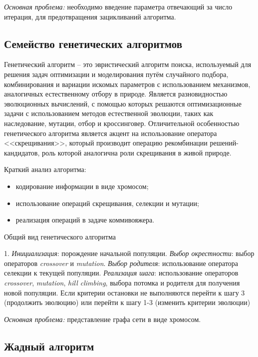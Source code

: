 \emph{Основная проблема:} необходимо введение параметра отвечающий за число итерация, для предотвращения 
зацикливаний алгоритма.

\subsection{Семейство генетических алгоритмов}
Генетический алгоритм -- это эвристический алгоритм поиска, используемый для решения задач оптимизации и 
моделирования путём случайного подбора, комбинирования и вариации искомых параметров с использованием 
механизмов, аналогичных естественному отбору в природе. Является разновидностью эволюционных вычислений, 
с помощью которых решаются оптимизационные задачи с использованием методов естественной эволюции, таких 
как наследование, мутации, отбор и кроссинговер. Отличительной особенностью генетического алгоритма 
является акцент на использование оператора <<скрещивания>>, который производит операцию рекомбинации 
решений-кандидатов, роль которой аналогична роли скрещивания в живой природе.

Краткий анализ алгоритма:
\begin{itemize}
    \item кодирование информации в виде хромосом;
    \item использование операций скрещивания, селекции и мутации;
    \item реализация операций в задаче коммивояжера.
\end{itemize}

\begin{algorithm}[ht!]
    \caption{Общий вид генетического алгоритма}
    1. \emph{Инициализация}: порождение начальной популяции. \emph{Выбор окрестности}: выбор операторов \emph{crossover} и \emph{mutation}. \emph{Выбор родителя}: использование оператора селекции к текущей популяции. \emph{Реализация шага}: использование операторов \emph{crossover}, 
        \emph{mutation}, \emph{hill climbing}, выбора потомка и родителя для получения 
        новой популяции. Если критерии остановки не выполняются перейти к шагу 3 (продолжить эволюцию) 
        или перейти к шагу 1-3 (изменить критерии эволюции)\;
    \label{alg:genetic}
\end{algorithm}

\emph{Основная проблема:} представление графа сети в виде хромосом.

\clearpage

\subsection{Жадный алгоритм}
\label{sec:greedy-alg}
